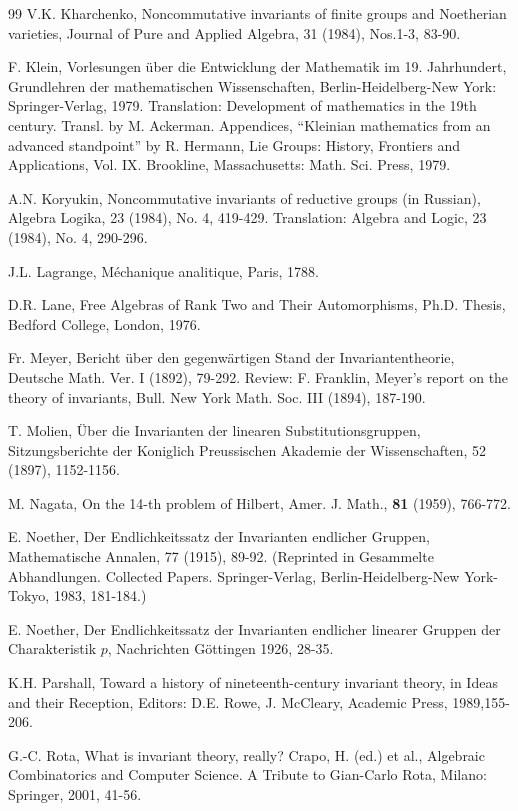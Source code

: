 \documentclass{amsart}
\theoremstyle{definition}
\begin{document}
\begin{thebibliography}{99}
V.K. Kharchenko,
Noncommutative invariants of finite groups and Noetherian varieties,
Journal of Pure and Applied Algebra, 31 (1984), Nos.1-3, 83-90.

F. Klein,
Vorlesungen \"uber die Entwicklung der Mathematik im 19. Jahrhundert,
Grundlehren der mathematischen Wissenschaften, Berlin-Heidelberg-New York: Springer-Verlag, 1979.
Translation: Development of mathematics in the 19th century. Transl. by M. Ackerman.
Appendices, ``Kleinian mathematics from an advanced standpoint'' by R. Hermann,
Lie Groups: History, Frontiers and Applications, Vol. IX. Brookline, Massachusetts: Math. Sci. Press, 1979.

A.N. Koryukin,
Noncommutative invariants of reductive groups (in Russian),
Algebra Logika, 23 (1984), No. 4, 419-429.
Translation: Algebra and Logic, 23 (1984), No. 4, 290-296.

J.L. Lagrange, M\'echanique analitique, Paris, 1788.

	
D.R. Lane,
Free Algebras of Rank Two and Their Automorphisms,
Ph.D. Thesis, Bedford College, London, 1976.

Fr. Meyer,
Bericht \"uber den gegenw\"artigen Stand der Invariantentheorie,
Deutsche Math. Ver. I (1892), 79-292.
Review: F. Franklin, Meyer's report on the theory of invariants, Bull. New York Math. Soc. III (1894), 187-190.

T. Molien,
\"{U}ber die Invarianten der linearen Substitutionsgruppen,
Sitzungsberichte der Koniglich Preussischen Akademie der Wissenschaften, 52 (1897), 1152-1156.

M. Nagata,
On the 14-th problem of Hilbert,
Amer. J. Math., {\bf 81} (1959), 766-772.

E. Noether,
Der Endlichkeitssatz der Invarianten endlicher Gruppen,
Mathematische Annalen, 77 (1915), 89-92.
(Reprinted in Gesammelte Abhandlungen. Collected Papers. Springer-Verlag, Berlin-Heidelberg-New York-Tokyo, 1983, 181-184.)

E. Noether,
Der Endlichkeitssatz der Invarianten endlicher linearer Gruppen der Charakteristik $p$,
Nachrichten G\"ottingen 1926, 28-35.

K.H. Parshall,
Toward a history of nineteenth-century invariant theory,
in Ideas and their Reception, Editors: D.E. Rowe, J. McCleary,
Academic Press, 1989,155-206.

G.-C. Rota,
What is invariant theory, really?
Crapo, H. (ed.) et al., Algebraic Combinatorics and Computer Science. A Tribute to Gian-Carlo Rota, Milano: Springer, 2001, 41-56.


\end{thebibliography}
\end{document}
